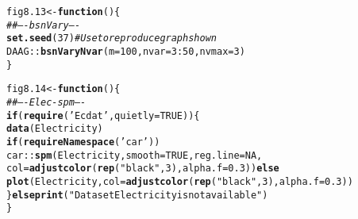 \documentclass[12pt, a4paper,  BCOR=8.25mm, DIV=15]{scrartcl}\usepackage[]{graphicx}\usepackage[]{color}
\makeatletter
\newcommand{\hlnum}[1]{\textcolor[rgb]{0.686,0.059,0.569}{#1}}%
\newcommand{\hlstr}[1]{\textcolor[rgb]{0.192,0.494,0.8}{#1}}%
\newcommand{\hlcom}[1]{\textcolor[rgb]{0.678,0.584,0.686}{\textit{#1}}}%
\newcommand{\hlopt}[1]{\textcolor[rgb]{0,0,0}{#1}}%
\newcommand{\hlstd}[1]{\textcolor[rgb]{0.345,0.345,0.345}{#1}}%
\newcommand{\hlkwa}[1]{\textcolor[rgb]{0.161,0.373,0.58}{\textbf{#1}}}%
\newcommand{\hlkwb}[1]{\textcolor[rgb]{0.69,0.353,0.396}{#1}}%
\newcommand{\hlkwc}[1]{\textcolor[rgb]{0.333,0.667,0.333}{#1}}%
\newcommand{\hlkwd}[1]{\textcolor[rgb]{0.737,0.353,0.396}{\textbf{#1}}}%
\newenvironment{kframe}{%
 \def\at@end@of@kframe{}%
 \ifinner\ifhmode%
  \def\at@end@of@kframe{\end{minipage}}%
  \begin{minipage}{\columnwidth}%
 \fi\fi%
 \def\FrameCommand##1{\hskip\@totalleftmargin \hskip-\fboxsep
 \colorbox{shadecolor}{##1}\hskip-\fboxsep
     \hskip-\linewidth \hskip-\@totalleftmargin \hskip\columnwidth}%
 \MakeFramed {\advance\hsize-\width
   \@totalleftmargin\z@ \linewidth\hsize
   \@setminipage}}%
 {\par\unskip\endMakeFramed%
 \at@end@of@kframe}
\newenvironment{knitrout}{}{} %
\makeatother
\begin{document}
\begin{knitrout}
\color{fgcolor}\begin{kframe}
\begin{alltt}
\hlstd{fig8.13} \hlkwb{<-} \hlkwa{function}\hlstd{()\{}
\hlcom{## ---- bsnVary ----}
\hlkwd{set.seed}\hlstd{(}\hlnum{37}\hlstd{)}   \hlcom{# Use to reproduce graph shown}
\hlstd{DAAG}\hlopt{::}\hlkwd{bsnVaryNvar}\hlstd{(}\hlkwc{m}\hlstd{=}\hlnum{100}\hlstd{,} \hlkwc{nvar}\hlstd{=}\hlnum{3}\hlopt{:}\hlnum{50}\hlstd{,} \hlkwc{nvmax}\hlstd{=}\hlnum{3}\hlstd{)}
\hlstd{\}}
\end{alltt}
\end{kframe}
\end{knitrout}

\begin{knitrout}
\color{fgcolor}\begin{kframe}
\begin{alltt}
\hlstd{fig8.14} \hlkwb{<-} \hlkwa{function}\hlstd{()\{}
\hlcom{## ---- Elec-spm ----}
\hlkwa{if}\hlstd{(}\hlkwd{require}\hlstd{(}\hlstr{'Ecdat'}\hlstd{,} \hlkwc{quietly}\hlstd{=}\hlnum{TRUE}\hlstd{))\{}
  \hlkwd{data}\hlstd{(Electricity)}
  \hlkwa{if}\hlstd{(}\hlkwd{requireNamespace}\hlstd{(}\hlstr{'car'}\hlstd{))}
  \hlstd{car}\hlopt{::}\hlkwd{spm}\hlstd{(Electricity,} \hlkwc{smooth}\hlstd{=}\hlnum{TRUE}\hlstd{,} \hlkwc{reg.line}\hlstd{=}\hlnum{NA}\hlstd{,}
           \hlkwc{col}\hlstd{=}\hlkwd{adjustcolor}\hlstd{(}\hlkwd{rep}\hlstd{(}\hlstr{"black"}\hlstd{,}\hlnum{3}\hlstd{),} \hlkwc{alpha.f}\hlstd{=}\hlnum{0.3}\hlstd{))} \hlkwa{else}
      \hlkwd{plot}\hlstd{(Electricity,} \hlkwc{col}\hlstd{=}\hlkwd{adjustcolor}\hlstd{(}\hlkwd{rep}\hlstd{(}\hlstr{"black"}\hlstd{,}\hlnum{3}\hlstd{),} \hlkwc{alpha.f}\hlstd{=}\hlnum{0.3}\hlstd{))}
\hlstd{\}} \hlkwa{else} \hlkwd{print}\hlstd{(}\hlstr{"Dataset Electricity is not available"}\hlstd{)}
\hlstd{\}}
\end{alltt}
\end{kframe}
\end{knitrout}
\end{document}

